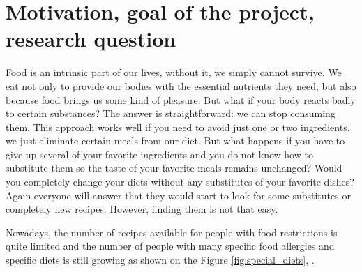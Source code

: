  \section{Motivation, goal of the project, research question}
    
    Food is an intrinsic part of our lives, without it, we simply cannot survive. We eat not only to provide our bodies with the essential nutrients they need, but also because food brings us some kind of pleasure.  But what if your body reacts badly to certain substances? The answer is straightforward: we can stop consuming them. This approach works well if you need to avoid just one or two ingredients, we just eliminate certain meals from our diet. But what happens if you have to give up several of your favorite ingredients and you do not know how to substitute them so the taste of your favorite meals remains unchanged? Would you completely change your diets without any substitutes of your favorite dishes? Again everyone will answer that they would start to look for some substitutes or completely new recipes. However, finding them is not that easy.
    {\par}
    Nowadays, the number of recipes available for people with food restrictions is quite limited and the number of people with many specific food allergies \cite{warren2020epidemiology} and specific diets is still growing as shown on the Figure \ref{fig:special_diets}, \cite{martin2020prescription}.
    
